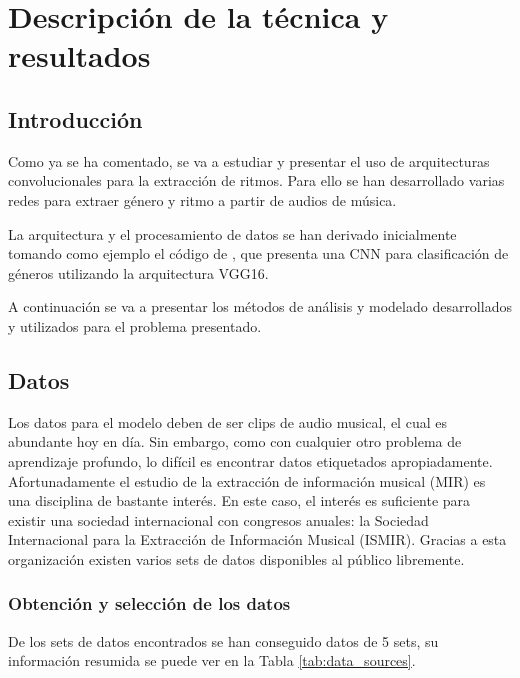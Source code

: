 \chapter{Descripción de la técnica y resultados}\label{Chapter:modelo}

\section{Introducción}\label{sec:modelo_intro}
\noindent Como ya se ha comentado, se va a estudiar y presentar el uso de arquitecturas convolucionales para la extracción de ritmos. Para ello se han desarrollado varias redes para extraer género y ritmo a partir de audios de música. 

La arquitectura y el procesamiento de datos se han derivado inicialmente tomando como ejemplo el código de \cite{hguimares:gtzankeras}, que presenta una CNN para clasificación de géneros utilizando la arquitectura VGG16.

A continuación se va a presentar los métodos de análisis y modelado desarrollados y utilizados para el problema presentado.

\section{Datos}\label{sec:datos}
\noindent Los datos para el modelo deben de ser clips de audio musical, el cual es abundante hoy en día. Sin embargo, como con cualquier otro problema de aprendizaje profundo, lo difícil es encontrar datos etiquetados apropiadamente. Afortunadamente el estudio de la extracción de información musical (MIR) es una disciplina de bastante interés. En este caso, el interés es suficiente para existir una sociedad internacional con congresos anuales: la Sociedad Internacional para la Extracción de Información Musical (ISMIR). Gracias a esta organización existen varios sets de datos disponibles al público libremente. 

\subsection{Obtención y selección de los datos}\label{sec:datos_get}
\noindent De los sets de datos encontrados se han conseguido datos de 5 sets, su información resumida se puede ver en la Tabla \ref{tab:data_sources}.

